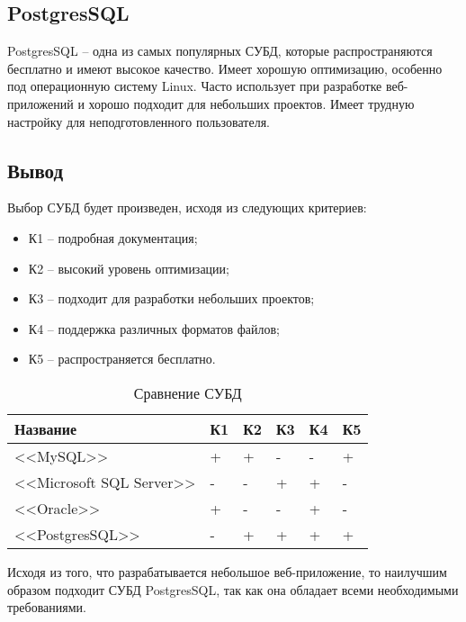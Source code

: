 \subsection{PostgresSQL}

PostgresSQL \cite{postgres} -- одна из самых популярных СУБД, которые распространяются бесплатно и имеют высокое качество. Имеет хорошую оптимизацию, особенно под операционную систему Linux. Часто использует при разработке веб-приложений и хорошо подходит для небольших проектов. Имеет трудную настройку для неподготовленного пользователя.

\subsection*{Вывод}

Выбор СУБД будет произведен, исходя из следующих критериев:

\begin{itemize}
    \item К1 -- подробная документация;
    \item К2 -- высокий уровень оптимизации;
    \item К3 -- подходит для разработки небольших проектов;
    \item К4 -- поддержка различных форматов файлов;
    \item К5 -- распространяется бесплатно.
\end{itemize}

\captionsetup{justification=raggedleft,singlelinecheck=off}
\begin{table}[H]
    \centering
	\caption{Сравнение СУБД}
    \label{tbl:compare_subd}
	\begin{tabular}{|l|l|l|l|l|l|}
        \hline
        \textbf{Название} & \textbf{К1} & \textbf{К2} & \textbf{К3} & \textbf{К4} & \textbf{К5} \\ \hline

        <<MySQL>>                   & + & + & - & - & + \\ \hline
        <<Microsoft SQL Server>>    & - & - & + & + & - \\ \hline
        <<Oracle>>                  & + & - & - & + & - \\ \hline
        <<PostgresSQL>>             & - & + & + & + & + \\ \hline

    \end{tabular}
\end{table}

Исходя из того, что разрабатывается небольшое веб-приложение, то наилучшим образом подходит СУБД PostgresSQL, так как она обладает всеми необходимыми требованиями.


